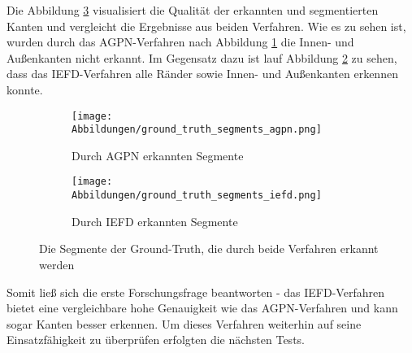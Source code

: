 Die Abbildung \ref{fig: segments_comparision_grnd_trth} visualisiert die Qualität der erkannten und segmentierten Kanten und vergleicht die Ergebnisse aus beiden Verfahren. Wie es zu sehen ist, wurden durch das AGPN-Verfahren nach Abbildung \ref{fig: agpn_segments_grnd_trth} die Innen- und Außenkanten nicht erkannt. Im Gegensatz dazu ist lauf Abbildung \ref{fig: iefd_segments_grnd_trth} zu sehen, dass das IEFD-Verfahren alle Ränder sowie Innen- und Außenkanten erkennen konnte. 

\begin{figure}[h]
	\centering
	\begin{subfigure}[h]{0.49\textwidth}
		\texttt{[image: Abbildungen/ground\_truth\_segments\_agpn.png]}
		\centering
		\caption{Durch AGPN erkannten Segmente}
		\label{fig: agpn_segments_grnd_trth}
	\end{subfigure}
	\hfil
	\begin{subfigure}[h]{0.49\textwidth}
		\texttt{[image: Abbildungen/ground\_truth\_segments\_iefd.png]}
		\centering
		\caption{Durch IEFD erkannten Segmente}
		\label{fig: iefd_segments_grnd_trth}
	\end{subfigure}
	\caption{Die Segmente der Ground-Truth, die durch beide Verfahren erkannt werden}
	\label{fig: segments_comparision_grnd_trth}
\end{figure}

Somit ließ sich die erste Forschungsfrage beantworten - das IEFD-Verfahren bietet eine vergleichbare hohe Genauigkeit wie das AGPN-Verfahren und kann sogar Kanten besser erkennen. Um dieses Verfahren weiterhin auf seine Einsatzfähigkeit zu überprüfen erfolgten die nächsten Tests.

